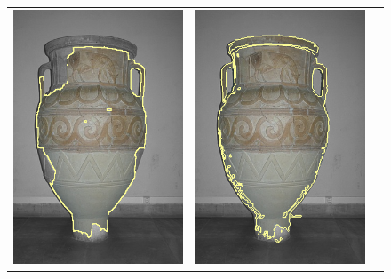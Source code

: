 \documentclass[smallextended]{svjour3}       %
\begin{document}
{{\begin{figure}[ht!]
\begin{tabular}{ccc}
		\includegraphics[scale=0.2]{segmentation_bc_vase_gc-seg.png} &
		\includegraphics[scale=0.2]{segmentation_schoenemann_vase_vase-seg.png} &

\end{tabular}
\end{figure}}}
\end{document}
